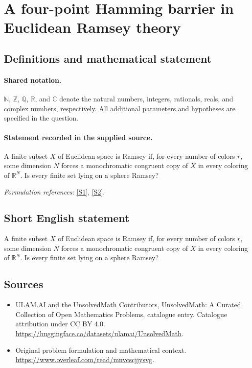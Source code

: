 \documentclass[11pt]{article}
\newcommand{\sref}[2]{\hyperlink{source:#1:#2}{[S#2]}}
\begin{document}
\section{A four-point Hamming barrier in Euclidean Ramsey theory}\label{statement}

\subsection{Definitions and mathematical statement}

\paragraph{Shared notation.}$\mathbb N$, $\mathbb Z$, $\mathbb Q$, $\mathbb R$, and $\mathbb C$ denote the natural numbers, integers, rationals, reals, and complex numbers, respectively. All additional parameters and hypotheses are specified in the question.


\paragraph{Statement recorded in the supplied source.}
A finite subset $X$ of Euclidean space is Ramsey if, for every number of colors $r$, some dimension $N$ forces a monochromatic congruent copy of $X$ in every coloring of $\mathbb R^N$. Is every finite set lying on a sphere Ramsey?
\par\smallskip\textit{Formulation references:} \sref{statement}{1}, \sref{statement}{2}.
\subsection{Short English statement}
A finite subset $X$ of Euclidean space is Ramsey if, for every number of colors $r$, some dimension $N$ forces a monochromatic congruent copy of $X$ in every coloring of $\mathbb R^N$. Is every finite set lying on a sphere Ramsey?
\subsection{Sources}
\begin{itemize}
\item[\hypertarget{source:statement:1}{S1}] ULAM.AI and the UnsolvedMath Contributors, UnsolvedMath: A Curated Collection of Open Mathematics Problems, catalogue entry. Catalogue attribution under CC BY 4.0.
\url{https://huggingface.co/datasets/ulamai/UnsolvedMath}.
\item[\hypertarget{source:statement:2}{S2}] Original problem formulation and mathematical context.
\url{https://www.overleaf.com/read/mnvcscjjysvg}.
\end{itemize}
\label{end:statement}
\end{document}
